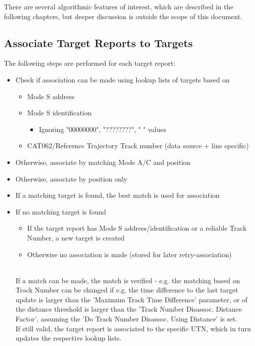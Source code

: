 There are several algorithmic features of interest, which are described in the following chapters, but deeper discussion is outside the scope of this document.

\subsection{Associate Target Reports to Targets}

The following steps are performed for each target report:
\begin{itemize}
\item Check if association can be made using lookup lists of targets based on
\begin{itemize}
\item Mode S address
\item Mode S identification
\begin{itemize}
\item Ignoring "00000000", "????????", "        " values
\end{itemize}
\item CAT062/Reference Trajectory Track number (data source + line specific)
\end{itemize}
\item Otherwise, associate by matching Mode A/C and position
\item Otherwise, associate by position only
\item If a matching target is found, the best match is used for association
\item If no matching target is found
\begin{itemize}
\item If the target report has Mode S address/identification or a reliable Track Number, a new target is created
\item Otherwise no association is made (stored for later retry-association)
\end{itemize}
\ \\

If a match can be made, the match is verified - e.g. the matching based on Track Number can be changed if e.g. the time difference to the last target update is larger than the 'Maximum Track Time Difference' parameter, or of the distance threshold is larger than the 'Track Number Disassoc. Distance Factor', assuming the 'Do Track Number Disassoc. Using Distance' is set. \\

If still valid, the target report is associated to the specific UTN, which in turn updates the respective lookup lists.


\end{itemize}

